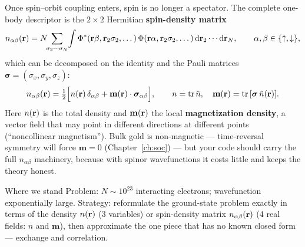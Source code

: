Once spin--orbit coupling enters, spin is no longer a spectator. The complete
one-body descriptor is the $2\times 2$ Hermitian \textbf{spin-density
matrix}
\begin{equation}
n_{\alpha\beta}(\mathbf{r}) = N\!\!\sum_{\sigma_2\cdots\sigma_N}\!\int
\Phi^*(\mathbf{r}\beta, \mathbf{r}_2\sigma_2, \dots)\,
\Phi(\mathbf{r}\alpha, \mathbf{r}_2\sigma_2, \dots)\, \mathrm{d}\mathbf{r}_2\cdots \mathrm{d}\mathbf{r}_N ,
\qquad \alpha,\beta\in\{\uparrow,\downarrow\},
\label{eq:spindensmat}
\end{equation}
which can be decomposed on the identity and the Pauli matrices
$\bm\sigma = (\sigma_x,\sigma_y,\sigma_z)$:
\begin{equation}
n_{\alpha\beta}(\mathbf{r}) = \tfrac12\Big[n(\mathbf{r})\,\delta_{\alpha\beta}
+ \mathbf{m}(\mathbf{r})\cdot\bm\sigma_{\alpha\beta}\Big],
\qquad
n = \mathrm{tr}\,\hat n, \quad
\mathbf{m}(\mathbf{r}) = \mathrm{tr}\,[\bm\sigma\, \hat n(\mathbf{r})].
\end{equation}
Here $n(\mathbf{r})$ is the total density and $\mathbf{m}(\mathbf{r})$ the local
\textbf{magnetization density}, a vector field that may point in different
directions at different points (``noncollinear magnetism''). Bulk gold is
non-magnetic --- time-reversal symmetry will force $\mathbf{m}=0$
(Chapter~\ref{ch:soc}) --- but your code should carry the full
$n_{\alpha\beta}$ machinery, because with spinor wavefunctions it costs
little and keeps the theory honest.

\begin{keybox}{Where we stand}
Problem: $N \sim 10^{23}$ interacting electrons; wavefunction exponentially
large. Strategy: reformulate the ground-state problem exactly in terms of the
density $n(\mathbf{r})$ (3 variables) or spin-density matrix $n_{\alpha\beta}(\mathbf{r})$
(4 real fields: $n$ and $\mathbf m$), then approximate the one piece that has no known closed
form --- exchange and correlation.
\end{keybox}
